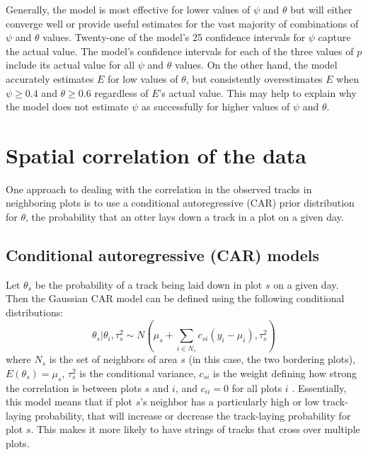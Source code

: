 \documentclass[12pt]{article}
\begin{document}
    Generally, the model is most effective for lower values of \(\psi\) and
    \(\theta\) but will either converge well or provide useful estimates for the
    vast majority of combinations of \(\psi\) and \(\theta\) values. Twenty-one
    of the
    model's 25 confidence intervals for \(\psi\) capture the actual value.
    The model's confidence intervals for each of the
    three values of \(p\) include its actual value for all \(\psi\) and
    \(\theta\) values. On the other hand, the model accurately estimates \(E\)
    for low values of \(\theta\), but consistently overestimates \(E\) when
    \(\psi\geq0.4\) and \(\theta\geq0.6\) regardless of \(E\)'s actual value.
    This may help to explain why the model does not estimate \(\psi\) as
    successfully for higher values of \(\psi\) and \(\theta\).

\section{Spatial correlation of the data}
One approach to dealing with the correlation in the
observed tracks in neighboring plots is to use a conditional autoregressive
(CAR) prior distribution for $\theta$, the probability that an otter lays down a
track in a plot on a given day.

    \subsection{Conditional autoregressive (CAR) models}
    Let $\theta_s$ be the probability of a track being laid down in plot $s$ on
    a given day. Then the Gaussian CAR model can be defined using the following
    conditional distributions:
    \begin{equation}
        \theta_s|\theta_i,\tau_s^2 \sim N(\mu_s+\sum_{i\in N_s}
        c_{si}(y_i-\mu_i),\tau_s^2)
    \end{equation}
    where $N_s$ is the set of neighbors of area $s$ (in this case, the two
    bordering plots), $E(\theta_s)=\mu_s$, $\tau_s^2$ is the conditional
    variance, $c_{si}$ is the weight defining how strong the correlation is
    between plots $s$ and $i$, and $c_{ii}=0$ for all plots $i$ \cite{Arab2008}.
    Essentially, this model means that if plot $s$'s neighbor has a
    particularly high or low track-laying probability, that will increase or
    decrease the track-laying probability for plot $s$. This makes it more
    likely to have strings of tracks that cross over multiple plots.
\end{document}
